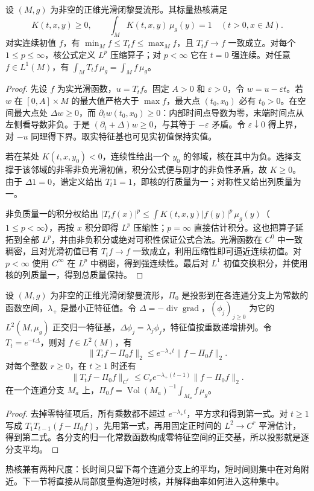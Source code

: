 \begin{proposition}\label{g3:prop:heat-maximum-mass}
	设 \((M,g)\) 为非空的正维光滑闭黎曼流形。其标量热核满足
	\[
		K(t,x,y)\ge0,\qquad
		\int_MK(t,x,y)\,\mu_g(y)=1
		\quad(t>0,x\in M).
	\]
	对实连续初值 \(f\)，有 \(\min_M f\le T_tf\le\max_M f\)，且 \(T_tf\to f\) 一致成立。对每个 \(1\le p\le\infty\)，核公式定义 \(L^p\) 压缩算子；对 \(p<\infty\) 它在 \(t=0\) 强连续。对任意 \(f\in L^1(M)\)，有 \(\int_MT_tf\,\mu_g=\int_Mf\,\mu_g\)。
\end{proposition}
\begin{proof}
	先设 \(f\) 为实光滑函数，\(u=T_tf\)。固定 \(A>0\) 和 \(\varepsilon>0\)，令 \(w=u-\varepsilon t\)。若 \(w\) 在 \([0,A]\times M\) 的最大值严格大于 \(\max f\)，最大点 \((t_0,x_0)\) 必有 \(t_0>0\)。在空间最大点处 \(\Delta w\ge0\)，而 \(\partial_tw(t_0,x_0)\ge0\)：内部时间点导数为零，末端时间点从左侧看导数非负。于是 \((\partial_t+\Delta)w\ge0\)，与其等于 \(-\varepsilon\) 矛盾。令 \(\varepsilon\downarrow0\) 得上界，对 \(-u\) 同理得下界。取实特征基也可见实初值保持实值。

	若在某处 \(K(t,x,y_0)<0\)，连续性给出一个 \(y_0\) 的邻域，核在其中为负。选择支撑于该邻域的非零非负光滑初值，积分公式便与刚才的非负性矛盾，故 \(K\ge0\)。由于 \(\Delta1=0\)，谱定义给出 \(T_t1=1\)，即核的行质量为一；对称性又给出列质量为一。

	非负质量一的积分权给出 \(|T_tf(x)|^p\le\int K(t,x,y)|f(y)|^p\,\mu_g(y)\)（\(1\le p<\infty\)），再按 \(x\) 积分即得 \(L^p\) 压缩性；\(p=\infty\) 直接估计积分。这也把算子延拓到全部 \(L^p\)，并由非负积分或绝对可积性保证公式合法。光滑函数在 \(C^0\) 中一致稠密，且对光滑初值已有 \(T_tf\to f\) 一致成立，利用压缩性即可逼近连续初值。对 \(p<\infty\) 使用 \(C^\infty\) 在 \(L^p\) 中稠密，得到强连续性。最后对 \(L^1\) 初值交换积分，并使用核的列质量一，得到总质量保持。
\end{proof}

\begin{proposition}\label{g3:prop:heat-large-time}
	设 \((M,g)\) 为非空的正维光滑闭黎曼流形，\(\Pi_0\) 是投影到在各连通分支上为常数的函数空间，\(\lambda_+\) 是最小正特征值。令 \(\Delta=-\operatorname{div}\operatorname{grad}\)，\((\phi_j)_{j\ge0}\) 为它的 \(L^2(M,\mu_g)\) 正交归一特征基，\(\Delta\phi_j=\lambda_j\phi_j\)，特征值按重数递增排列。令 \(T_t=e^{-t\Delta}\)，则对 \(f\in L^2(M)\)，有
	\[
		\|T_tf-\Pi_0f\|_2\le e^{-\lambda_+t}\|f-\Pi_0f\|_2.
	\]
	对每个整数 \(r\ge0\)，在 \(t\ge1\) 时还有
	\[
		\|T_tf-\Pi_0f\|_{C^r}
		\le C_r e^{-\lambda_+(t-1)}\|f-\Pi_0f\|_2.
	\]
	在一个连通分支 \(M_a\) 上，\(\Pi_0f=\operatorname{Vol}(M_a)^{-1}\int_{M_a}f\,\mu_g\)。
\end{proposition}
\begin{proof}
	去掉零特征项后，所有乘数都不超过 \(e^{-\lambda_+t}\)，平方求和得到第一式。对 \(t\ge1\) 写成 \(T_1T_{t-1}(f-\Pi_0f)\)，先用第一式，再用固定正时间的 \(L^2\to C^r\) 平滑估计，得到第二式。各分支的归一化常数函数构成零特征空间的正交基，所以投影就是逐分支平均。
\end{proof}

热核兼有两种尺度：长时间只留下每个连通分支上的平均，短时间则集中在对角附近。下一节将直接从局部度量构造短时核，并解释曲率如何进入这种集中。
